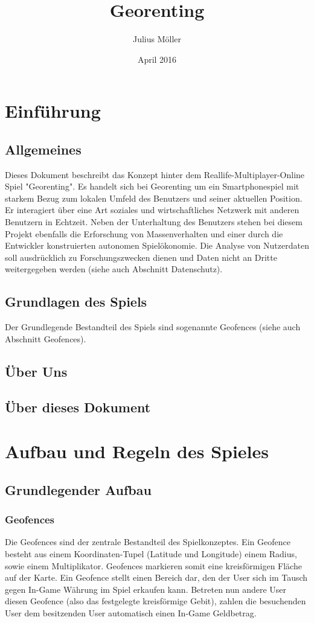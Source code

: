 \documentclass{scrreprt}
\title{Georenting}
\author{Julius Möller}
\date{April 2016}
\begin{document}
\maketitle

\tableofcontents


\chapter{Einführung}
\section{Allgemeines}
Dieses Dokument beschreibt das Konzept hinter dem Reallife-Multiplayer-Online Spiel "Georenting". Es handelt sich bei Georenting um ein Smartphonespiel mit starkem Bezug zum lokalen Umfeld des Benutzers und seiner aktuellen Position. Er interagiert über eine Art soziales und wirtschaftliches Netzwerk mit anderen Benutzern in Echtzeit. Neben der Unterhaltung des Benutzers stehen bei diesem Projekt ebenfalls die Erforschung von Massenverhalten und einer durch die Entwickler konstruierten autonomen Spielökonomie. Die Analyse von Nutzerdaten soll ausdrücklich zu Forschungszwecken dienen und Daten nicht an Dritte weitergegeben werden (siehe auch Abschnitt Datenschutz).
\section{Grundlagen des Spiels}
Der Grundlegende Bestandteil des Spiels sind sogenannte Geofences (siehe auch Abschnitt Geofences). 
\section{Über Uns}
\section{Über dieses Dokument}

\chapter{Aufbau und Regeln des Spieles}
\section{Grundlegender Aufbau}
\subsection{Geofences}
Die Geofences sind der zentrale Bestandteil des Spielkonzeptes. Ein Geofence besteht aus einem Koordinaten-Tupel (Latitude und Longitude) einem Radius, sowie einem Multiplikator. Geofences markieren somit eine kreisförmigen Fläche auf der Karte. 
Ein Geofence stellt einen Bereich dar, den der User sich im Tausch gegen In-Game Währung im Spiel erkaufen kann. Betreten nun andere User diesen Geofence (also das festgelegte kreisförmige Gebit), zahlen die besuchenden User dem besitzenden User automatisch einen In-Game Geldbetrag.\\
\end{document}
